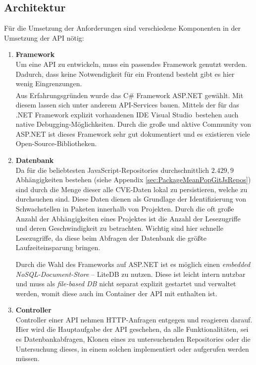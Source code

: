 \subsection{Architektur} \label{sec:ArchitekturV1}
    Für die Umsetzung der Anforderungen sind verschiedene Komponenten in der Umsetzung der \ac{API} nötig:
    \begin{enumerate}
        \item \textbf{Framework} \label{arch_1}\\
            Um eine \ac{API} zu entwickeln, muss ein passendes Framework genutzt werden.
            Dadurch, dass keine Notwendigkeit für ein Frontend besteht gibt es hier wenig Eingrenzungen.
            \\
            Aus Erfahrungsgründen wurde das C\# Framework ASP.NET\textsuperscript{\cite{link:ASPNET}} gewählt.
            Mit diesem lassen sich unter anderem \ac{API}-Services bauen.
            Mittels der für das .NET Framework explizit vorhandenen IDE \glqq Visual Studio\grqq~bestehen auch native Debugging-Möglichkeiten.
            Durch die große und aktive Community von ASP.NET ist dieses Framework sehr gut dokumentiert und es existieren viele Open-Source-Bibliotheken.
        \item \textbf{Datenbank} \label{arch_2}\\
            Da für die beliebtesten JavaScript-Repositories durchschnittlich $2.429,9$ Abhängigkeiten bestehen (siehe Appendix \ref{sec:PackageMeanPopGitJsRepos}) sind durch die Menge dieser alle \ac{CVE}-Daten lokal zu persistieren, welche zu durchsuchen sind.
            Diese Daten dienen als Grundlage der Identifizierung von Schwachstellen in Paketen innerhalb von Projekten.
            Durch die oft große Anzahl der Abhängigkeiten eines Projektes ist die Anzahl der Lesezugriffe und deren Geschwindigkeit zu betrachten.
            Wichtig sind hier schnelle Lesezugriffe, da diese beim Abfragen der Datenbank die größte Laufzeiteinsparung bringen.

            Durch die Wahl des Frameworks auf ASP.NET ist es möglich einen \textit{embedded NoSQL-Document-Store} -- LiteDB zu nutzen. %
            Diese ist leicht intern nutzbar und muss als \textit{file-based DB} nicht separat explizit gestartet und verwaltet werden, womit diese auch im Container der \ac{API} mit enthalten ist.
        \item \textbf{Controller} \label{arch_3}\\
            Controller einer \ac{API} nehmen HTTP-Anfragen entgegen und reagieren darauf.
            Hier wird die Hauptaufgabe der \ac{API} geschehen, da alle Funktionalitäten, sei es Datenbankabfragen, Klonen eines zu untersuchenden Repositories oder die Untersuchung dieses, in einem solchen implementiert oder aufgerufen werden müssen.


\end{enumerate}
